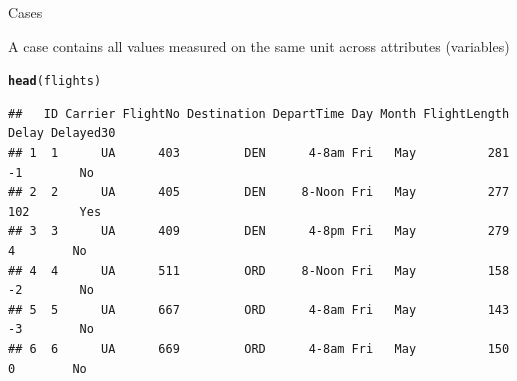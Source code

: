 \documentclass[10pt]{beamer}\usepackage[]{graphicx}\usepackage[]{color}
\makeatletter
\newcommand{\hlstd}[1]{\textcolor[rgb]{0.345,0.345,0.345}{#1}}%
\newcommand{\hlkwd}[1]{\textcolor[rgb]{0.737,0.353,0.396}{\textbf{#1}}}%
\newenvironment{kframe}{%
 \def\at@end@of@kframe{}%
 \ifinner\ifhmode%
  \def\at@end@of@kframe{\end{minipage}}%
  \begin{minipage}{\columnwidth}%
 \fi\fi%
 \def\FrameCommand##1{\hskip\@totalleftmargin \hskip-\fboxsep
 \colorbox{shadecolor}{##1}\hskip-\fboxsep
     \hskip-\linewidth \hskip-\@totalleftmargin \hskip\columnwidth}%
 \MakeFramed {\advance\hsize-\width
   \@totalleftmargin\z@ \linewidth\hsize
   \@setminipage}}%
 {\par\unskip\endMakeFramed%
 \at@end@of@kframe}
\newenvironment{knitrout}{}{} %
\makeatother
\begin{document}
\begin{frame}[fragile]{Cases}

A case contains all values measured on the same unit across attributes (variables)

\begin{knitrout}\scriptsize
{}\color{fgcolor}\begin{kframe}
\begin{alltt}
\hlkwd{head}\hlstd{(flights)}
\end{alltt}
\begin{verbatim}
##   ID Carrier FlightNo Destination DepartTime Day Month FlightLength Delay Delayed30
## 1  1      UA      403         DEN      4-8am Fri   May          281    -1        No
## 2  2      UA      405         DEN     8-Noon Fri   May          277   102       Yes
## 3  3      UA      409         DEN      4-8pm Fri   May          279     4        No
## 4  4      UA      511         ORD     8-Noon Fri   May          158    -2        No
## 5  5      UA      667         ORD      4-8am Fri   May          143    -3        No
## 6  6      UA      669         ORD      4-8am Fri   May          150     0        No
\end{verbatim}
\end{kframe}
\end{knitrout}

\end{frame}
\end{document}
